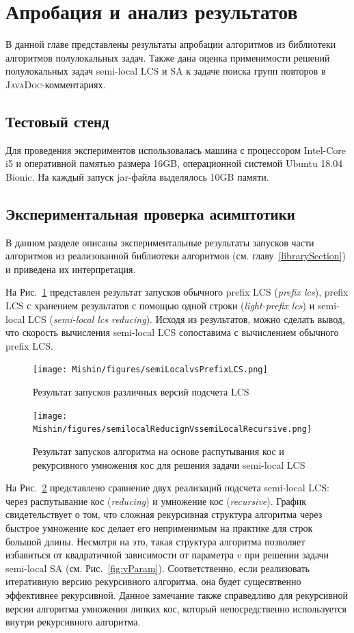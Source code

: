 \section{Апробация и анализ результатов}\label{appob}
В данной главе представлены результаты апробации алгоритмов из библиотеки алгоритмов полулокальных задач.
Также дана оценка применимости решений полулокальных задач semi-local LCS и SA к задаче поиска групп повторов в \textsc{JavaDoc}-комментариях.


\subsection{Тестовый стенд}

Для проведения экспериментов использовалась машина с процессором Intel-Core i5 и оперативной памятью размера 16GB, операционной системой Ubuntu 18.04 Bionic.
На каждый запуск jar-файла выделялось 10GB памяти.

\subsection{Экспериментальная проверка асимптотики}

В данном разделе описаны экспериментальные результаты запусков части алгоритмов из реализованной библиотеки алгоритмов (см. главу~\ref{librarySection}) и приведена их интерпретация.

На Рис.~\ref{fig:speedlcs} представлен результат запусков обычного prefix LCS (\emph{prefix lcs}), prefix LCS с хранением результатов с помощью одной строки (\emph{light-prefix lcs}) и semi-local LCS (\emph{semi-local lcs reducing}).
Исходя из результатов, можно сделать вывод, что скорость вычисления semi-local LCS сопоставима с вычислением обычного prefix LCS.

\begin{figure}[t!]
\centering
    \texttt{[image: Mishin/figures/semiLocalvsPrefixLCS.png]}
    \caption{Результат запусков различных версий подсчета LCS }\label{fig:speedlcs}
\end{figure}

\begin{figure}[t!]
\centering
    \texttt{[image: Mishin/figures/semilocalReducignVssemiLocalRecursive.png]}
    \caption{Результат запусков алгоритма на основе распутывания кос и рекурсивного умножения кос для решения задачи semi-local LCS }\label{fig:speedlcs2}
\end{figure}

На Рис.~\ref{fig:speedlcs2} представлено сравнение двух реализаций подсчета semi-local LCS: через распутывание кос (\emph{reducing}) и умножение кос (\emph{recursive}).
График свидетельствует о том, что сложная рекурсивная структура алгоритма через быстрое умножение кос делает его неприменимым на практике для строк большой длины.
Несмотря на это, такая структура алгоритма позволяет избавиться от квадратичной зависимости от параметра $v$ при решении задачи semi-local SA (см. Рис.~\ref{fig:vParam}).
Соответственно, если реализовать итеративную версию рекурсивного алгоритма, она будет сущесвтвенно эффективнее рекурсивной.
Данное замечание также справедливо для рекурсивной версии алгоритма умножения липких кос, который непосредственно используется внутри рекурсивного алгоритма.

